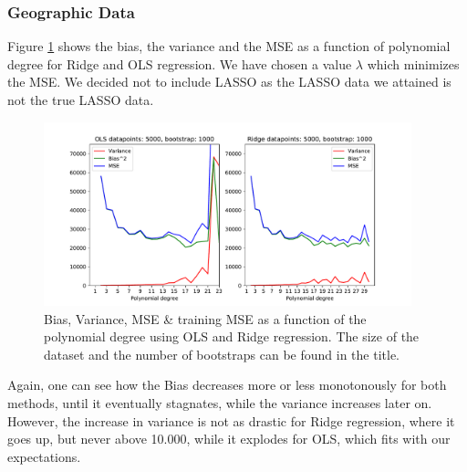 \documentclass[11pt,a4paper,titlepage]{article}
\begin{document}
\subsubsection{Geographic Data}

Figure \ref{fig:biasVariance_Korea} shows the bias, the variance and the MSE as a function of polynomial degree for Ridge and OLS regression. We have chosen a value $\lambda$ which minimizes the MSE. We decided not to include LASSO as the LASSO data we attained is not the true LASSO data.
\begin{figure}[H]
\centering
\includegraphics[width=0.95\textwidth]{Bias_variance_Korea.pdf}
\caption[Bias, Variance, MSE \& training MSE as a function of the polynomial degree for geodata]{Bias, Variance, MSE \& training MSE as a function of the polynomial degree using OLS and Ridge regression. The size of the dataset and the number of bootstraps can be found in the title.}
\label{fig:biasVariance_Korea}
\end{figure}
 Again, one can see how the Bias decreases more or less monotonously for both methods, until it eventually stagnates, while the variance increases later on. However, the increase in variance is not as drastic for Ridge regression, where it goes up, but never above 10.000, while it explodes for OLS, which fits with our expectations. 
\end{document}
